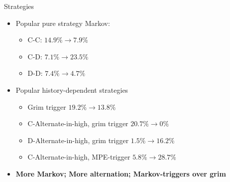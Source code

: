 \documentclass{beamer}
\begin{document}




\begin{frame}{Strategies}

\begin{itemize}
\item Popular pure strategy Markov:

\begin{itemize}
\item C-C: $14.9\%\rightarrow7.9\%$
\item C-D: $7.1\%\rightarrow23.5\%$
\item D-D: $7.4\%\rightarrow4.7\%$
\end{itemize}
\item Popular history-dependent strategies

\begin{itemize}
\item Grim trigger $19.2\%\rightarrow13.8\%$
\item C-Alternate-in-high, grim trigger $20.7\%\rightarrow0\%$
\item D-Alternate-in-high, grim trigger $1.5\%\rightarrow16.2\%$
\item C-Alternate-in-high, MPE-trigger $5.8\%\rightarrow28.7\%$
\end{itemize}
\item \textbf{More Markov; More alternation; Markov-triggers over grim}
\end{itemize}
\end{frame}
\end{document}
